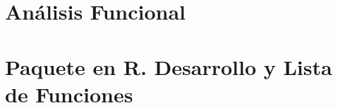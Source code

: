 \documentclass[pdftex,11pt, oneside]{book}
\begin{document}

\appendix
\chapter{Análisis Funcional} \label{ap:AnalisisFunc}


\chapter{Paquete en R. Desarrollo y Lista de Funciones} \label{ap:Paquete}

\backmatter
{}
\printbibliography
\end{document}
